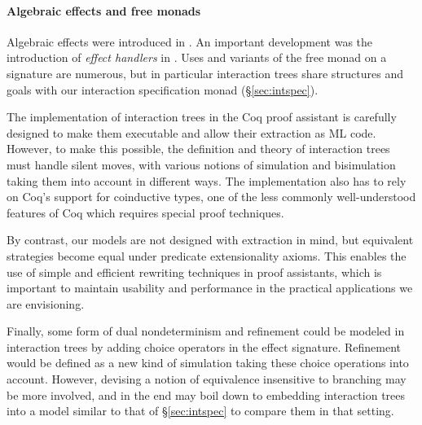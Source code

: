 \documentclass[sigplan,screen]{acmart}
\begin{document}
\paragraph{Algebraic effects and free monads}

Algebraic effects were introduced in \cite{effadq}.
An important development was
the introduction of \emph{effect handlers} in \cite{eff}.
Uses and variants of the free monad
on a signature are numerous,
but in particular
interaction trees \cite{itree}
share structures and goals with
our interaction specification monad (\S\ref{sec:intspec}).

The implementation of interaction trees in the Coq proof
assistant is carefully designed to make them executable and
allow their extraction as ML code.
However, to make this possible,
the definition and theory of interaction trees
must handle silent moves,
with various notions of simulation and bisimulation
taking them into account in different ways.
The implementation also has to rely on
Coq's support for coinductive types, one of the less
commonly well-understood features of Coq which requires
special proof techniques.

By contrast, our models are not designed with extraction in mind,
but equivalent strategies become equal under
predicate extensionality axioms. This enables
the use of simple and efficient rewriting techniques
in proof assistants,
which is important to maintain usability and performance
in the practical applications we are envisioning.

Finally,
some form of dual nondeterminism and refinement could be modeled
in interaction trees by adding choice operators in the effect
signature. Refinement would be defined as a new kind
of simulation taking these choice operations into account.
However, devising a notion of equivalence insensitive to
branching may be more involved, and in the end may boil down to
embedding interaction trees into a model similar to that of
\S\ref{sec:intspec} to
compare them in that setting.




\end{document}
